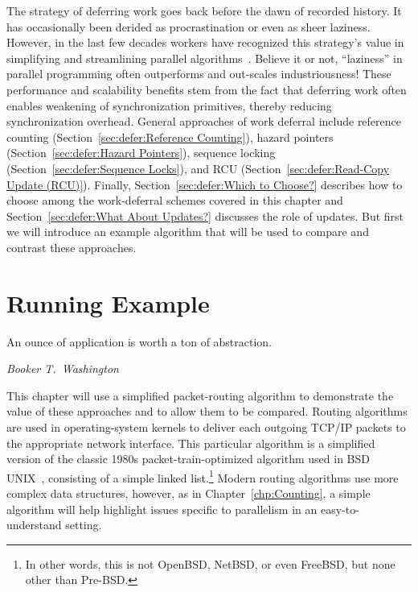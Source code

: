 
%

The strategy of deferring work goes back before the dawn of recorded
history. It has occasionally been derided as procrastination or
even as sheer laziness.
However, in the last few decades workers have recognized this strategy's value
in simplifying and streamlining parallel algorithms~\cite{Kung80,HMassalinPhD}.
Believe it or not, ``laziness'' in parallel programming often outperforms and
out-scales industriousness!
These performance and scalability benefits stem from the fact that
deferring work often enables weakening of synchronization primitives,
thereby reducing synchronization overhead.
General approaches of work deferral include
reference counting (Section~\ref{sec:defer:Reference Counting}),
hazard pointers (Section~\ref{sec:defer:Hazard Pointers}),
sequence locking (Section~\ref{sec:defer:Sequence Locks}),
and RCU (Section~\ref{sec:defer:Read-Copy Update (RCU)}).
Finally, Section~\ref{sec:defer:Which to Choose?}
describes how to choose among the work-deferral schemes covered in
this chapter and Section~\ref{sec:defer:What About Updates?}
discusses the role of updates.
But first we will introduce an example algorithm that will be used
to compare and contrast these approaches.

\section{Running Example}
\label{sec:defer:Running Example}
%
\epigraph{An ounce of application is worth a ton of abstraction.}
	 {\emph{Booker T.~Washington}}

This chapter will use a simplified packet-routing algorithm to demonstrate
the value of these approaches and to allow them to be compared.
Routing algorithms are used in operating-system kernels to
deliver each outgoing TCP/IP packets to the appropriate network interface.
This particular algorithm is a simplified version of the classic 1980s
packet-train-optimized algorithm used in BSD UNIX~\cite{VanJacobson88},
consisting of a simple linked list.\footnote{
	In other words, this is not OpenBSD, NetBSD, or even
	FreeBSD, but none other than Pre-BSD.}
Modern routing algorithms use more complex data structures, however, as in
Chapter~\ref{chp:Counting}, a simple algorithm will
help highlight issues specific to parallelism in an
easy-to-understand setting.

